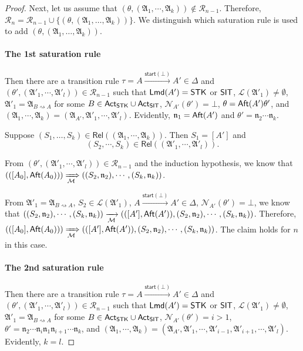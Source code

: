 \documentclass[preprint,12pt]{elsarticle}
\newcommand\Mm{{\mathcal{M} }}
\newcommand\act{{\sf Act}}
\newcommand\aft{{\sf Aft}}
\newcommand\lmd{{\sf Lmd}}
\newcommand\singletask{{\sf STK}}
\newcommand\singleinstance{{\sf SIT}}
\newcommand\startactivity{{\mathsf{start} }}
\newcommand\namefun{\mathcal{N}}
\newcommand\aname{\mathfrak{n}}
\newcommand\AutReach{\mathscr{R}}
\newcommand\Rel{\mathsf{Rel}}
\newcommand{\STK}{\mathsf{STK}}
\newcommand\Aut{{\mathfrak{A} }}
\newcommand\Lang{{\mathscr{L} }}
\begin{document}
\begin{proof}
Next, let us assume that $(\theta, (\Aut_1, \cdots, \Aut_k)) \not \in  \AutReach_{n-1}$.
Therefore, $\AutReach_{n} = \AutReach_{n-1} \cup \{(\theta,(\Aut_1,\dots,\Aut_k))\}$.  
%
We distinguish which saturation rule is used to add $(\theta,(\Aut_1,\dots,\Aut_k))$.


\paragraph*{The 1st saturation rule} Then  there are a transition rule $\tau = A \xrightarrow{\startactivity(\bot)} A'  \in \Delta$ and $(\theta', (\Aut'_1, \cdots, \Aut'_l)) \in \AutReach_{n-1}$ such that $\lmd(A')=\STK$ or $\singleinstance$, $\Lang(\Aut'_1) \neq \emptyset$, $\Aut'_1 = \Aut_{B\rightsquigarrow A}$ for some $B \in \act_\singletask\cup\act_\singleinstance$, $\namefun_{A'}(\theta') = \bot$, $\theta = \aft(A') \theta'$, and $(\Aut_1, \cdots, \Aut_k) = (\Aut_{A'}, \Aut'_1, \cdots, \Aut'_l)$. 
Evidently, $\aname_1 = \aft(A')$ and $\theta' = \aname_2 \cdots \aname_k$. 

Suppose $(S_1,\dots,S_k) \in \Rel((\Aut_1, \cdots, \Aut_k))$. Then $S_1 = [A']$ and 
$$(S_2, \cdots, S_k) \in \Rel((\Aut'_1, \cdots, \Aut'_l)).$$ 

From $(\theta', (\Aut'_1, \cdots, \Aut'_l)) \in \AutReach_{n-1}$ and the induction hypothesis, we know that $(([A_0], \aft(A_0))) \xRightarrow[\Mm]{} ((S_2, \aname_2), \cdots, (S_k, \aname_k))$. 

From $\Aut'_1 = \Aut_{B\rightsquigarrow A}$, $S_2 \in \Lang(\Aut'_1)$, $A \xrightarrow{\startactivity(\bot)}A'  \in \Delta$, $\namefun_{A'}(\theta') = \bot$, we know that 
$((S_2, \aname_2), \cdots, (S_k, \aname_k)) \xrightarrow[\Mm]{} (([A'], \aft(A')), (S_2, \aname_2), \cdots, (S_k, \aname_k))$.
Therefore, 
$(([A_0], \aft(A_0))) \xRightarrow[\Mm]{} (([A'], \aft(A')), (S_2, \aname_2), \cdots, (S_k, \aname_k))$. 
The claim holds for $n$ in this case. 


\paragraph*{The 2nd saturation rule} Then there are a transition rule $\tau = A \xrightarrow{\startactivity(\bot)} A'  \in \Delta$ and $(\theta', (\Aut'_1, \cdots, \Aut'_l)) \in \AutReach_{n-1}$ such that $\lmd(A')=\STK$ or $\singleinstance$, $\Lang(\Aut'_1) \neq \emptyset$, $\Aut'_1 = \Aut_{B\rightsquigarrow A}$ for some $B \in \act_\singletask \cup \act_\singleinstance$, $\namefun_{A'}(\theta') = i > 1$, 
$\theta' = \aname_2  \cdots  \aname_{i} \aname_1  \aname_{i+1}  \cdots  \aname_k$, and 
$(\Aut_1, \cdots, \Aut_k) = (\Aut_{A'}, \Aut'_1, \cdots, \Aut'_{i-1}, \Aut'_{i+1}, \cdots, \Aut'_l)$. Evidently, $k = l$.


\end{proof}
\end{document}
